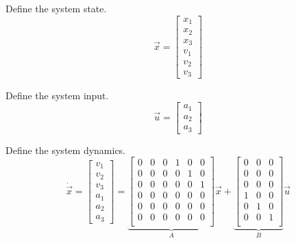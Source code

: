 \documentclass[12pt,onecolumn,reqno]{amsart}
\begin{document}
Define the system state.
\begin{equation}
  \vec{x} = 
  \begin{bmatrix}
    x_{1} \\
    x_{2} \\
    x_{3} \\
    v_{1} \\
    v_{2} \\
    v_{3}
  \end{bmatrix}
\end{equation}

Define the system input.
\begin{equation}
  \vec{u} = 
  \begin{bmatrix}
    a_{1} \\
    a_{2} \\
    a_{3}
  \end{bmatrix}
\end{equation}

Define the system dynamics.
\begin{equation}
  \dot{\vec{x}}
  =
  \begin{bmatrix}
    v_{1} \\
    v_{2} \\
    v_{3} \\
    a_{1} \\
    a_{2} \\
    a_{3}
  \end{bmatrix}
  =
  \underbrace{
  \begin{bmatrix}
    0 & 0 & 0 & 1 & 0 & 0  \\
    0 & 0 & 0 & 0 & 1 & 0  \\
    0 & 0 & 0 & 0 & 0 & 1  \\
    0 & 0 & 0 & 0 & 0 & 0  \\
    0 & 0 & 0 & 0 & 0 & 0  \\
    0 & 0 & 0 & 0 & 0 & 0  \\
  \end{bmatrix}
  }_{A}
  \vec{x}
  +
  \underbrace{
  \begin{bmatrix}
    0 & 0 & 0 \\
    0 & 0 & 0 \\
    0 & 0 & 0 \\
    1 & 0 & 0 \\
    0 & 1 & 0 \\
    0 & 0 & 1 \\
  \end{bmatrix}
  }_{B}
  \vec{u}
\end{equation}
\end{document}
